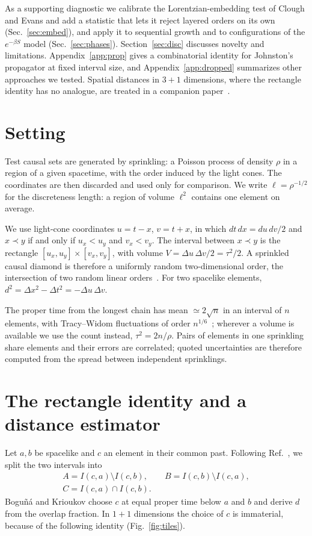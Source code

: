 \documentclass[prd,twocolumn,superscriptaddress,nofootinbib,amsmath,amssymb,floatfix]{revtex4-2}
\begin{document}
As a supporting diagnostic we calibrate the Lorentzian-embedding test of Clough and Evans and add a statistic that lets it reject layered orders on its own (Sec.~\ref{sec:embed}), and apply it to sequential growth and to configurations of the $e^{-\beta S}$ model (Sec.~\ref{sec:phases}). Section~\ref{sec:disc} discusses novelty and limitations. Appendix~\ref{app:prop} gives a combinatorial identity for Johnston's propagator at fixed interval size, and Appendix~\ref{app:dropped} summarizes other approaches we tested. Spatial distances in $3+1$ dimensions, where the rectangle identity has no analogue, are treated in a companion paper~\cite{Embedding}.

\section{Setting}\label{sec:setting}
Test causal sets are generated by sprinkling: a Poisson process of density $\rho$ in a region of a given spacetime, with the order induced by the light cones. The coordinates are then discarded and used only for comparison. We write $\ell=\rho^{-1/2}$ for the discreteness length: a region of volume $\ell^2$ contains one element on average.

We use light-cone coordinates $u=t-x$, $v=t+x$, in which $dt\,dx=du\,dv/2$ and $x\prec y$ if and only if $u_x<u_y$ and $v_x<v_y$. The interval between $x\prec y$ is the rectangle $[u_x,u_y]\times[v_x,v_y]$, with volume $V=\Delta u\,\Delta v/2=\tau^2/2$. A sprinkled causal diamond is therefore a uniformly random two-dimensional order, the intersection of two random linear orders~\cite{BHS08,Surya12}. For two spacelike elements, $d^2=\Delta x^2-\Delta t^2=-\Delta u\,\Delta v$.

The proper time from the longest chain has mean $\simeq2\sqrt n$ in an interval of $n$ elements, with Tracy--Widom fluctuations of order $n^{1/6}$~\cite{BDJ99}; wherever a volume is available we use the count instead, $\tau^2=2n/\rho$. Pairs of elements in one sprinkling share elements and their errors are correlated; quoted uncertainties are therefore computed from the spread between independent sprinklings.

\section{The rectangle identity and a distance estimator}\label{sec:dist}
Let $a,b$ be spacelike and $c$ an element in their common past. Following Ref.~\cite{BK24}, we split the two intervals into
\begin{equation}
\begin{gathered}
A=I(c,a)\setminus I(c,b),\qquad B=I(c,b)\setminus I(c,a),\\
C=I(c,a)\cap I(c,b).
\end{gathered}
\end{equation}
Bogu\~n\'a and Krioukov choose $c$ at equal proper time below $a$ and $b$ and derive $d$ from the overlap fraction. In $1+1$ dimensions the choice of $c$ is immaterial, because of the following identity (Fig.~\ref{fig:tiles}).
\end{document}
